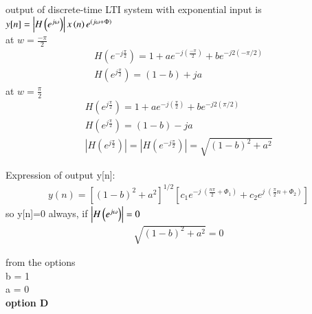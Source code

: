 \documentclass[journal,12pt,twocolumn]{IEEEtran}
\begin{document}
\begin{large}
output of discrete-time LTI system with exponential input is $y[n]= \left| {H\left( {{e^{j{\rm{\omega }}}}} \right)} \right|x\left( n \right){e^{\left( {j{\rm{\omega }} + {\rm{\Phi }}} \right)}}$\\

at $w = \frac{-\pi}{2}$
\begin{align}
   H\left( {{e^{-j\frac{\pi }{2}}}} \right) = 1 + a{e^{- j\left( {\frac{-\pi }{2}} \right)}} + b{e^{ - j2\left( {-\pi /2} \right)}}\\
   H\left( {{e^{j\frac{\pi }{2}}}} \right)=(1 - b) +ja
\end{align}
at $w = \frac{\pi}{2}$
\begin{align}
   H\left( {{e^{j\frac{\pi }{2}}}} \right) = 1 + a{e^{ - j\left( {\frac{\pi }{2}} \right)}} + b{e^{ - j2\left( {\pi /2} \right)}}\\
   H\left( {{e^{j\frac{\pi }{2}}}} \right)=(1 - b) - ja\\
   \left| {H\left( {{e^{j\frac{\pi }{2}}}} \right)} \right| = \left| {H\left( {{e^{ - j\frac{\pi }{2}}}} \right)} \right|=\sqrt {{{\left( {1 - b} \right)}^2} + {a^2}} 
\end{align}

Expression of output y[n]:
\begin{align}
  y\left( n \right) = {\left[ {{{\left( {1 - b} \right)}^2} + {a^2}} \right]^{1/2}}\left[ {{c_1}{e^{ - j\;\left( \frac{{n\pi }}{2}  + \Phi_1 \right)}} + {c_2}{e^{j\;\left( \frac{\pi }{2}n + \Phi_2 \right)}}} \right] 
\end{align}
so y[n]=0 always, if $\left| {H\left( {{e^{j{\rm{\omega }}}}} \right)} \right|=0$
\begin{align}
  \sqrt {{{\left( {1 - b} \right)}^2} + {a^2}} =0
\end{align}

from the options\\
b = 1\\
a = 0\\
\textbf{option D}
\end{large}
\end{document}
